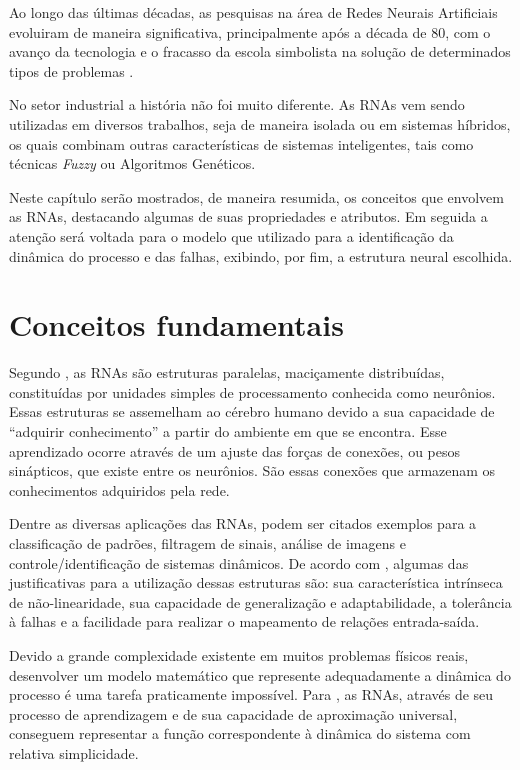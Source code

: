 \label{cap:rnas}

Ao longo das últimas décadas, as pesquisas na área de Redes Neurais Artificiais
evoluiram de maneira significativa, principalmente após a década de 80, com o
avanço da tecnologia e o fracasso da escola simbolista na solução de
determinados tipos de problemas \cite{braga:2007}.

No setor industrial a história não foi muito diferente. As RNAs vem sendo
utilizadas em diversos trabalhos, seja de maneira isolada ou em sistemas
híbridos, os quais combinam outras características de sistemas inteligentes,
tais como técnicas {\it Fuzzy} ou Algoritmos Genéticos.

Neste capítulo serão mostrados, de maneira resumida, os conceitos que envolvem
as RNAs, destacando algumas de suas propriedades e atributos. Em seguida a
atenção será voltada para o modelo que utilizado para a identificação da
dinâmica do processo e das falhas, exibindo, por fim, a estrutura neural
escolhida.

\section{Conceitos fundamentais}
Segundo , as RNAs são estruturas paralelas, maciçamente
distribuídas, constituídas por unidades simples de processamento conhecida como
neurônios. Essas estruturas se assemelham ao cérebro humano devido a sua
capacidade de ``adquirir conhecimento'' a partir do ambiente em que se encontra.
Esse aprendizado ocorre através de um ajuste das forças de conexões, ou pesos
sinápticos, que existe entre os neurônios. São essas conexões que armazenam os
conhecimentos adquiridos pela rede.

Dentre as diversas aplicações das RNAs, podem ser citados exemplos para a
classificação de padrões, filtragem de sinais, análise de imagens e
controle/identificação de sistemas dinâmicos. De acordo com
, algumas das justificativas para a utilização
dessas estruturas são: sua característica intrínseca de não-linearidade, sua
capacidade de generalização e adaptabilidade, a tolerância à falhas e a
facilidade para realizar o mapeamento de relações entrada-saída.

Devido a grande complexidade existente em muitos problemas físicos reais,
desenvolver um modelo matemático que represente adequadamente a dinâmica do
processo é uma tarefa praticamente impossível. Para ,
as RNAs, através de seu processo de aprendizagem e de sua capacidade de
aproximação universal, conseguem representar a função correspondente à dinâmica
do sistema com relativa simplicidade.

